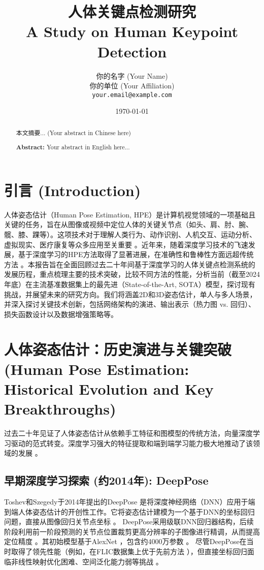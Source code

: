 \documentclass[12pt,a4paper]{article}
\title{人体关键点检测研究 \\ %
       {\large A Study on Human Keypoint Detection}} %
\author{你的名字 (Your Name) \\
        你的单位 (Your Affiliation) \\
        \texttt{your.email@example.com}}
\date{\today}
\begin{document}
\maketitle

\begin{abstract}
\noindent %
本文摘要... (Your abstract in Chinese here)
\vspace{0.5em} %

\noindent %
\textbf{Abstract:} Your abstract in English here...
\end{abstract}

\section{引言 (Introduction)}
人体姿态估计（Human Pose Estimation, HPE）是计算机视觉领域的一项基础且关键的任务，旨在从图像或视频中定位人体的关键关节点（如头、肩、肘、腕、髋、膝、踝等）\cite{Sun2019HRNet}。这项技术对于理解人类行为、动作识别、人机交互、运动分析、虚拟现实、医疗康复等众多应用至关重要 \cite{Zhou2016HumanPoseSurvey}。近年来，随着深度学习技术的飞速发展，基于深度学习的HPE方法取得了显著进展，在准确性和鲁棒性方面远超传统方法 \cite{Zhou2016HumanPoseSurvey}。本报告旨在全面回顾过去二十年间基于深度学习的人体关键点检测系统的发展历程，重点梳理主要的技术突破，比较不同方法的性能，分析当前（截至2024年底）在主流基准数据集上的最先进（State-of-the-Art, SOTA）模型，探讨现有挑战，并展望未来的研究方向。我们将涵盖2D和3D姿态估计，单人与多人场景，并深入探讨关键技术创新，包括网络架构的演进、输出表示（热力图 vs. 回归）、损失函数设计以及数据增强策略等。

\section[人体姿态估计：历史演进与关键突破]{人体姿态估计：历史演进与关键突破 \\ (Human Pose Estimation: Historical Evolution and Key Breakthroughs)}
过去二十年见证了人体姿态估计从依赖手工特征和图模型的传统方法，向量深度学习驱动的范式转变。深度学习强大的特征提取和端到端学习能力极大地推动了该领域的发展 \cite{Zhou2016HumanPoseSurvey}。

\subsection{早期深度学习探索 (约2014年): DeepPose}
Toshev和Szegedy于2014年提出的DeepPose \cite{Toshev2014DeepPose} 是将深度神经网络（DNN）应用于端到端人体姿态估计的开创性工作。它将姿态估计建模为一个基于DNN的坐标回归问题，直接从图像回归关节点坐标 \cite{Toshev2014DeepPose}。
DeepPose采用级联DNN回归器结构，后续阶段利用前一阶段预测的关节点位置裁剪更高分辨率的子图像进行精调，从而提高定位精度 \cite{Toshev2014DeepPose}。其初始模型基于AlexNet \cite{Krizhevsky2012ImageNetNIPS}，包含约4000万参数 \cite{Krizhevsky2012ImageNetNIPS}。
尽管DeepPose在当时取得了领先性能（例如，在FLIC数据集上优于先前方法 \cite{Krizhevsky2012ImageNetNIPS}），但直接坐标回归面临非线性映射优化困难、空间泛化能力弱等挑战 \cite{Cao2019OpenPose}。
\end{document}
